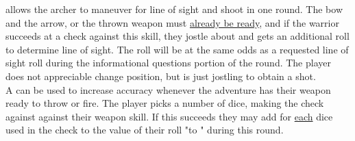 \begin{multicols*}{2}
{ allows the archer to maneuver for line of sight and shoot in one round. The bow and the arrow, or the thrown weapon must \ul{already be ready}, and if the warrior succeeds at a  check against this skill, they jostle about and gets an additional roll to determine line of sight. The roll will be at the same odds as a requested line of sight roll during the informational questions portion of the round. The player does not appreciable change position, but is just jostling to obtain a shot.\\

A  can be used to increase accuracy whenever the adventure has their weapon ready to throw or fire. The player picks a number of dice, making the check against against their weapon skill. If this succeeds they may add  for \ul{each} dice used in the check to the value of their roll "to " during this round.\\

}
\end{multicols*}
